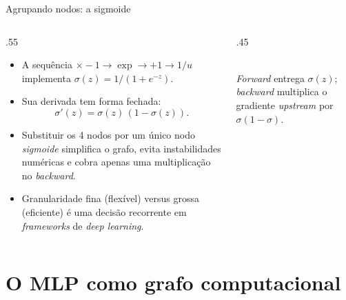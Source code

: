 \documentclass[aspectratio=169,xcolor=dvipsnames]{beamer}
\begin{document}
  \begin{frame}{Agrupando nodos: a sigmoide}
    \begin{columns}
      \begin{column}{.55\linewidth}
        \begin{itemize}
          \item A sequência $\times{-}1 \to \exp \to +1 \to 1/u$
            implementa $\sigma(z) = 1/(1+e^{-z})$.
          \item Sua derivada tem forma fechada:
            $$\sigma'(z) = \sigma(z)\,(1 - \sigma(z)).$$
          \item Substituir os 4 nodos por um único nodo \textit{sigmoide}
            simplifica o grafo, evita instabilidades numéricas e cobra apenas
            uma multiplicação no \textit{backward}.
          \item Granularidade fina (flexível) versus grossa (eficiente) é
            uma decisão recorrente em \textit{frameworks} de \textit{deep learning}.
        \end{itemize}
      \end{column}
      \begin{column}{.45\linewidth}
        \centering
        \\
        \footnotesize \textit{Forward} entrega $\sigma(z)$;
        \textit{backward} multiplica o gradiente \textit{upstream} por
        $\sigma(1{-}\sigma)$.
      \end{column}
    \end{columns}
  \end{frame}

  \section{O MLP como grafo computacional}
\end{document}
